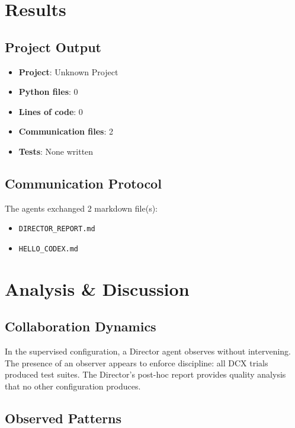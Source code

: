 \documentclass[11pt,a4paper]{article}
\begin{document}
\section{Results}

\subsection{Project Output}

\begin{itemize}
  \item \textbf{Project}: Unknown Project
  \item \textbf{Python files}: 0
  \item \textbf{Lines of code}: 0
  \item \textbf{Communication files}: 2
  \item \textbf{Tests}: None written
\end{itemize}

\subsection{Communication Protocol}

The agents exchanged 2 markdown file(s):
\begin{itemize}
  \item \texttt{DIRECTOR\_REPORT.md}
  \item \texttt{HELLO\_CODEX.md}
\end{itemize}

\section{Analysis \& Discussion}

\subsection{Collaboration Dynamics}

In the supervised configuration, a Director agent observes without intervening. The presence of an observer appears to enforce discipline: all DCX trials produced test suites. The Director's post-hoc report provides quality analysis that no other configuration produces.

\subsection{Observed Patterns}
\end{document}
